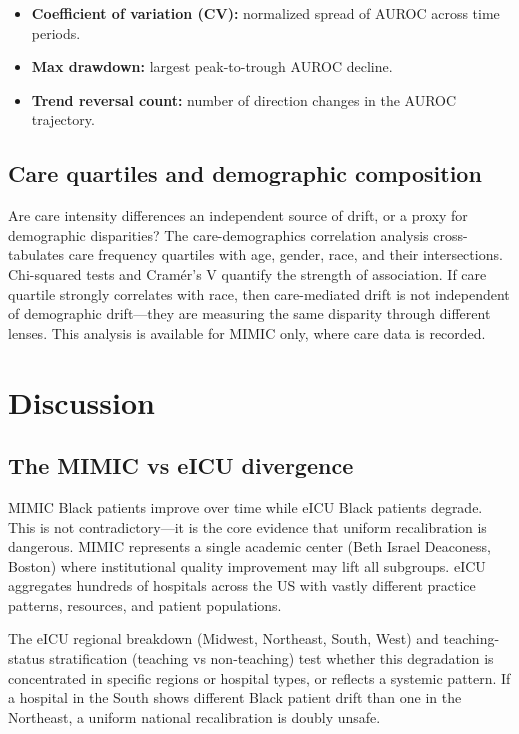 \documentclass[pdflatex,sn-mathphys-num]{sn-jnl}
\theoremstyle{thmstyleone}%
\theoremstyle{thmstyletwo}%
\theoremstyle{thmstylethree}%
\begin{document}
\begin{itemize}
\item \textbf{Coefficient of variation (CV):} normalized spread of AUROC across time periods.
\item \textbf{Max drawdown:} largest peak-to-trough AUROC decline.
\item \textbf{Trend reversal count:} number of direction changes in the AUROC trajectory.
\end{itemize}

\subsection{Care quartiles and demographic composition}\label{subsec:care_quartiles}

Are care intensity differences an independent source of drift, or a proxy for demographic disparities? The care-demographics correlation analysis cross-tabulates care frequency quartiles with age, gender, race, and their intersections. Chi-squared tests and Cram\'{e}r's V quantify the strength of association. If care quartile strongly correlates with race, then care-mediated drift is not independent of demographic drift---they are measuring the same disparity through different lenses. This analysis is available for MIMIC only, where care data is recorded.

\section{Discussion}\label{sec:discussion}

\subsection{The MIMIC vs eICU divergence}\label{subsec:divergence}

MIMIC Black patients improve over time while eICU Black patients degrade. This is not contradictory---it is the core evidence that uniform recalibration is dangerous. MIMIC represents a single academic center (Beth Israel Deaconess, Boston) where institutional quality improvement may lift all subgroups. eICU aggregates hundreds of hospitals across the US with vastly different practice patterns, resources, and patient populations.

The eICU regional breakdown (Midwest, Northeast, South, West) and teaching-status stratification (teaching vs non-teaching) test whether this degradation is concentrated in specific regions or hospital types, or reflects a systemic pattern. If a hospital in the South shows different Black patient drift than one in the Northeast, a uniform national recalibration is doubly unsafe.
\end{document}
